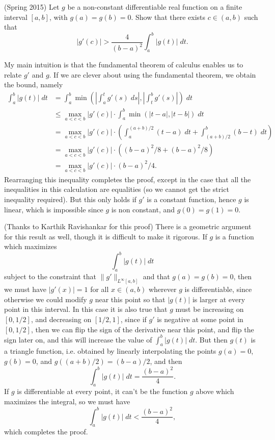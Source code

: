 \documentclass[answers]{exam}
\begin{document}
\begin{questions}
\question (Spring 2015) Let $g$ be a non-constant differentiable real function on a finite interval $[a,b]$, with $g(a) = g(b) = 0$. Show that there exists $c \in (a,b)$ such that
%
\[ |g'(c)| > \frac{4}{(b - a)^2} \int_a^b |g(t)|\; dt. \]
\begin{solution}
	My main intuition is that the fundamental theorem of calculus enables us to relate $g'$ and $g$. If we are clever about using the fundamental theorem, we obtain the bound, namely
	\begin{align*}
		\int_a^b |g(t)|\; dt &= \int_a^b \min \left( \left| \int_a^t g'(s)\; ds \right|, \left| \int_t^b g'(s) \right| \right)\; dt\\
		&\leq \max_{a < c < b} |g'(c)| \cdot \int_a^b \min(|t - a|, |t - b|)\; dt\\
		&= \max_{a < c < b} |g'(c)| \cdot \left( \int_a^{(a + b)/2} (t - a)\; dt + \int_{(a + b)/2}^b (b - t)\; dt \right)\\
		&= \max_{a < c < b} |g'(c)| \cdot \left( (b - a)^2/8 + (b - a)^2/8 \right)\\
		&= \max_{a < c < b} |g'(c)| \cdot (b-a)^2/4.
	\end{align*}
	Rearranging this inequality completes the proof, except in the case that all the inequalities in this calculation are equalities (so we cannot get the strict inequality required). But this only holds if $g'$ is a constant function, hence $g$ is linear, which is impossible since $g$ is non constant, and $g(0) = g(1) = 0$.

	(Thanks to Karthik Ravishankar for this proof) There is a geometric argument for this result as well, though it is difficult to make it rigorous. If $g$ is a function which maximizes
	\[ \int_a^b |g(t)|\; dt \]
	subject to the constraint that $\| g' \|_{L^\infty[a,b]}$ and that $g(a) = g(b) = 0$, then we must have $|g'(x)| = 1$ for all $x \in (a,b)$ wherever $g$ is differentiable, since otherwise we could modify $g$ near this point so that $|g(t)|$ is larger at every point in this interval. In this case it is also true that $g$ must be increasing on $[0,1/2]$, and decreasing on $[1/2,1]$, since if $g'$ is negative at some point in $[0,1/2]$, then we can flip the sign of the derivative near this point, and flip the sign later on, and this will increase the value of $\int_a^b |g(t)|\; dt$. But then $g(t)$ is a triangle function, i.e. obtained by linearly interpolating the points $g(a) = 0$, $g(b) = 0$, and $g((a + b)/2) = (b - a)/2$, and then
	\[ \int_a^b |g(t)|\; dt = \frac{(b - a)^2}{4}. \]
	If $g$ is differentiable at every point, it can't be the function $g$ above which maximizes the integral, so we must have
	\[ \int_a^b |g(t)|\; dt < \frac{(b - a)^2}{4}, \]
	which completes the proof.
\end{solution}


\end{questions}
\end{document}

